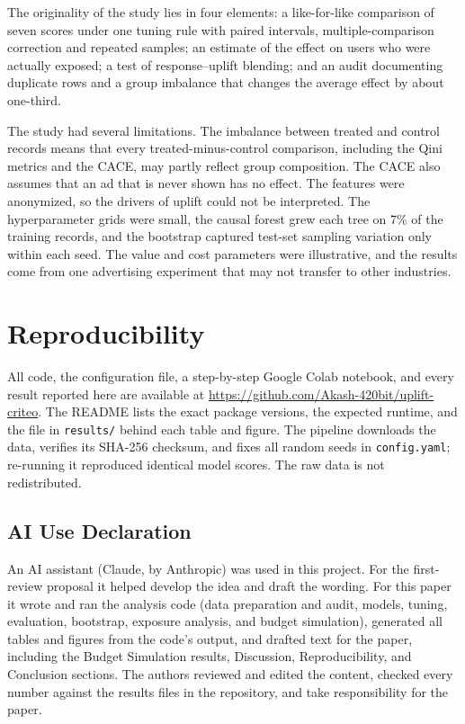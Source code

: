 \documentclass[conference]{IEEEtran}
\begin{document}
The originality of the study lies in four elements: a like-for-like
comparison of seven scores under one tuning rule with paired intervals,
multiple-comparison correction and repeated samples; an estimate of the
effect on users who were actually exposed; a test of response--uplift
blending; and an audit documenting duplicate rows and a group imbalance
that changes the average effect by about one-third.

The study had several limitations. The imbalance between treated and
control records means that every treated-minus-control comparison,
including the Qini metrics and the CACE, may partly reflect group
composition. The CACE also assumes that an ad that is never shown has
no effect. The features were anonymized, so the drivers of uplift could
not be interpreted. The hyperparameter grids were small, the causal
forest grew each tree on 7\% of the training records, and the bootstrap
captured test-set sampling variation only within each seed. The value
and cost parameters were illustrative, and the results come from one
advertising experiment that may not transfer to other industries.

\section{Reproducibility}

All code, the configuration file, a step-by-step Google Colab notebook,
and every result reported here are available at
\url{https://github.com/Akash-420bit/uplift-criteo}. The README lists the
exact package versions, the expected runtime, and the file in
\texttt{results/} behind each table and figure. The pipeline downloads
the data, verifies its SHA-256 checksum, and fixes all random seeds in
\texttt{config.yaml}; re-running it reproduced identical model scores.
The raw data is not redistributed.

\subsection{AI Use Declaration}

An AI assistant (Claude, by Anthropic) was used in this project. For the
first-review proposal it helped develop the idea and draft the wording.
For this paper it wrote and ran the analysis code (data preparation and
audit, models, tuning, evaluation, bootstrap, exposure analysis, and
budget simulation), generated all tables and figures from the code's
output, and drafted text for the paper, including the Budget Simulation
results, Discussion, Reproducibility, and Conclusion sections. The
authors reviewed and edited the content, checked every number against
the results files in the repository, and take responsibility for the
paper.
\end{document}
